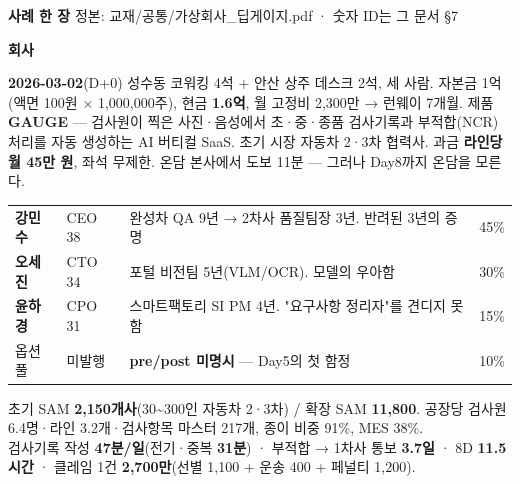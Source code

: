 \documentclass[10pt]{article}
\newcommand{\hd}[1]{{\color{navy}\bfseries\large #1}\par\vspace{1pt}{\color{navy}\rule{\linewidth}{0.6pt}}\par\vspace{3pt}}
\begin{document}
\small
{\color{navy}\bfseries\LARGE 사례 한 장}  \hfill {\color{grey}\footnotesize 정본: 교재/공통/가상회사\_딥게이지.pdf · 숫자 ID는 그 문서 §7}

\vspace{4pt}
\begin{minipage}[t]{0.46\linewidth}
\hd{회사}
\textbf{2026-03-02}(D+0) 성수동 코워킹 4석 + 안산 상주 데스크 2석, 세 사람. 자본금 1억(액면 100원 × 1,000,000주), 현금 \textbf{1.6억}, 월 고정비 2,300만 → 런웨이 7개월. 제품 \textbf{GAUGE} — 검사원이 찍은 사진·음성에서 초·중·종품 검사기록과 부적합(NCR) 처리를 자동 생성하는 AI 버티컬 SaaS. 초기 시장 자동차 2·3차 협력사. 과금 \textbf{라인당 월 45만 원}, 좌석 무제한. 온담 본사에서 도보 11분 — 그러나 Day8까지 온담을 모른다.

\vspace{3pt}\hd{창업팀 (= 여러분)}
\begin{tabularx}{\linewidth}{@{}l l X r@{}}
\toprule
\textbf{강민수} & CEO 38 & 완성차 QA 9년 → 2차사 품질팀장 3년. 반려된 3년의 증명 & 45\%\\
\textbf{오세진} & CTO 34 & 포털 비전팀 5년(VLM/OCR). 모델의 우아함 & 30\%\\
\textbf{윤하경} & CPO 31 & 스마트팩토리 SI PM 4년. "요구사항 정리자"를 견디지 못함 & 15\%\\
옵션풀 & 미발행 & \textbf{pre/post 미명시} — Day5의 첫 함정 & 10\%\\
\bottomrule
\end{tabularx}

\vspace{3pt}\hd{시장과 문제의 크기}
초기 SAM \textbf{2,150개사}(30\textasciitilde 300인 자동차 2·3차) / 확장 SAM \textbf{11,800}. 공장당 검사원 6.4명·라인 3.2개·검사항목 마스터 217개, 종이 비중 91\%, MES 38\%.\\
검사기록 작성 \textbf{47분/일}(전기·중복 \textbf{31분}) · 부적합 → 1차사 통보 \textbf{3.7일} · 8D \textbf{11.5시간} · 클레임 1건 \textbf{2,700만}(선별 1,100 + 운송 400 + 페널티 1,200).


\end{minipage}
\end{document}
